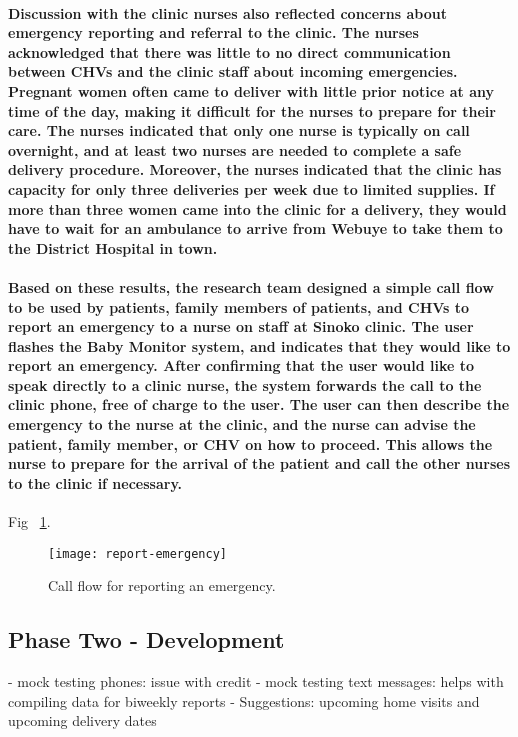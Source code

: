 {\paragraph{Discussion with the clinic nurses also reflected concerns about emergency reporting and referral to the clinic. The nurses acknowledged that there was little to no direct communication between CHVs and the clinic staff about incoming emergencies. Pregnant women often came to deliver with little prior notice at any time of the day, making it difficult for the nurses to prepare for their care. The nurses indicated that only one nurse is typically on call overnight, and at least two nurses are needed to complete a safe delivery procedure. Moreover, the nurses indicated that the clinic has capacity for only three deliveries per week due to limited supplies. If more than three women came into the clinic for a delivery, they would have to wait for an ambulance to arrive from Webuye to take them to the District Hospital in town.}

\paragraph{Based on these results, the research team designed a simple call flow to be used by patients, family members of patients, and CHVs to report an emergency to a nurse on staff at Sinoko clinic. The user flashes the Baby Monitor system, and indicates that they would like to report an emergency. After confirming that the user would like to speak directly to a clinic nurse, the system forwards the call to the clinic phone, free of charge to the user. The user can then describe the emergency to the nurse at the clinic, and the nurse can advise the patient, family member, or CHV on how to proceed. This allows the nurse to prepare for the arrival of the patient and call the other nurses to the clinic if necessary.}

Fig ~\ref{fig:emergency}.
\begin{figure}[tbp]
	\begin{center}
	\texttt{[image: report-emergency]}
	\end{center}
	\caption{Call flow for reporting an emergency.}
	\label{fig:emergency}
\end{figure}

\subsection{Phase Two - Development}
- mock testing phones: issue with credit
- mock testing text messages: helps with compiling data for biweekly reports
- Suggestions: upcoming home visits and upcoming delivery dates

}
